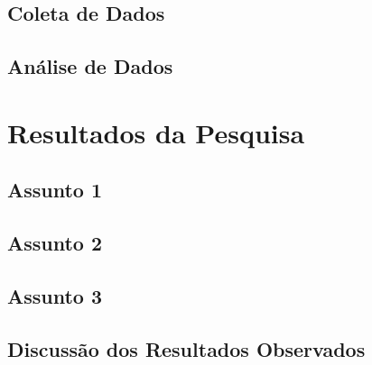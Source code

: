 \section{Coleta de Dados}
\preencheComTexto

\section{Análise de Dados}
\preencheComTexto


\chapter{Resultados da Pesquisa}
\preencheComTexto

\section{Assunto 1}
\preencheComTexto

\section{Assunto 2}
\preencheComTexto

\section{Assunto 3}
\preencheComTexto

\section{Discussão dos Resultados Observados}
\preencheComTexto





